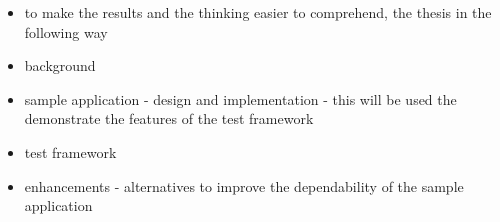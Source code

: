 \begin{itemize}
	\item to make the results and the thinking easier to comprehend, the thesis in the following way
	\item background
	\item sample application - design and implementation - this will be used the demonstrate the features of the test framework
	\item test framework
	\item enhancements - alternatives to improve the dependability of the sample application
\end{itemize}

























